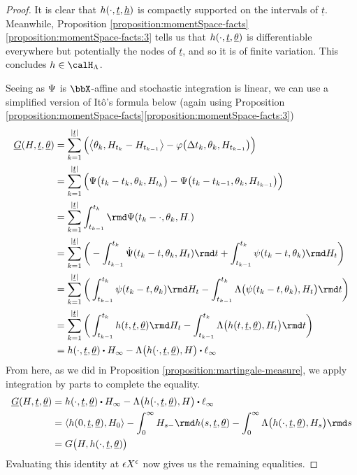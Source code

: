 \begin{proof}
  \label{proof:theorem:equivalence}
  It is clear that $h(\cdot, \underline t, \underline{h})$ is compactly supported on the intervals of $\underline t$.
  Meanwhile, Proposition \ref{proposition:momentSpace-facts}\ref{proposition:momentSpace-facts:3} tells us that $h(\cdot, \underline t, \underline{\theta})$ is differentiable everywhere but potentially the nodes of $\underline t$, and so it is of finite variation.
  This concludes $\twistFunc \in \twistSpace$.

  Seeing as $\Psi$ is $\stateSpace$-affine and stochastic integration is linear, we can use a simplified version of It\^o's formula below (again using Proposition \ref{proposition:momentSpace-facts}\ref{proposition:momentSpace-facts:3})
  \begin{align*}
    \fddRf(H, \underline t,\underline\twistVar)
    &= \sum_{k=1}^{|\underline t|} \Big( \bprj{\twistVar_k}{H_{t_k}-H_{t_{k-1}}} - \affShift\big(\Delta t_k, \twistVar_k, H_{t_{k-1}}\big) \Big) \\
    &= \sum_{k=1}^{|\underline t|} \Big( \aff\big(t_k-t_k, \twistVar_k, H_{t_k}\big) - \aff\big(t_k-t_{k-1}, \twistVar_k, H_{t_{k-1}}\big) \Big) \\
    &= \sum_{k=1}^{|\underline t|}  \int_{t_{k-1}}^{t_k} \rmd \aff(t_k-\cdot, \twistVar_k, H_\cdot) \\
    &= \sum_{k=1}^{|\underline t|} \bigg( -\int_{t_{k-1}}^{t_k} \dot\aff(t_k-t, \twistVar_k, H_t) \rmd t + \int_{t_{k-1}}^{t_k} \affPart(t_k-t,\twistVar_k) \rmd H_t \bigg) \\
    &= \sum_{k=1}^{|\underline t|} \bigg( \int_{t_{k-1}}^{t_k} \affPart(t_k-t, \twistVar_k) \rmd H_t - \int_{t_{k-1}}^{t_k} \ode\big(\affPart(t_k-t, \twistVar_k), H_t\big) \rmd t \bigg) \\
    &= \sum_{k=1}^{|\underline t|} \bigg( \int_{t_{k-1}}^{t_k} \twistFunc(t, \underline t, \underline\twistVar) \rmd H_t - \int_{t_{k-1}}^{t_k} \ode\big(\twistFunc(t, \underline t, \underline\twistVar), H_t\big) \rmd t \bigg) \\
    &= \twistFunc(\cdot, \underline t, \underline\twistVar) \shortInt H_\infty - \ode\big(\twistFunc(\cdot, \underline t, \underline\twistVar), H\big) \shortInt \leb_\infty
  \end{align*}
  From here, as we did in Proposition \ref{proposition:martingale-measure}, we apply integration by parts to complete the equality.
  \begin{align*}
    \fddRf(H, \underline t,\underline\twistVar)
    &=\twistFunc(\cdot, \underline t, \underline\twistVar) \shortInt H_\infty - \ode\big(\twistFunc(\cdot, \underline t, \underline\twistVar), H\big) \shortInt \leb_\infty \\
    &=\prj{\twistFunc(0,\underline t,\underline\twistVar)}{H_0} - \int_0^\infty H_{s-} \rmd\twistFunc(s,\underline t, \underline\twistVar) - \int_0^\infty \ode\big( \twistFunc(\cdot, \underline t, \underline\twistVar), H_s\big) \rmd s \\
    &= \mgRf\big(H, \twistFunc(\cdot,\underline t,\underline\twistVar)\big)
  \end{align*}
  Evaluating this identity at $\epsilon X^\epsilon$ now gives us the remaining equalities.
\end{proof}
